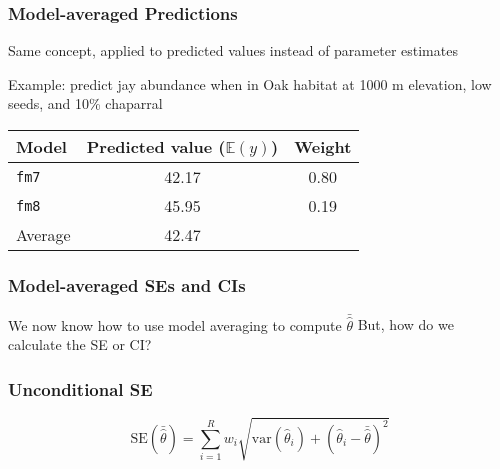\documentclass[color=usenames,dvipsnames]{beamer}\usepackage[]{graphicx}\usepackage[]{color}
\begin{document}
\begin{frame}
  \frametitle{Model-averaged Predictions}
  {Same concept, applied to predicted values instead of parameter
    estimates \par}
  \pause
  \vspace{0.3cm}
  {Example: predict jay abundance when in Oak habitat at 1000 m
    elevation, low seeds, and 10\% chaparral \par}
  \pause
  \begin{center}
    \begin{tabular}{lcc}
      \hline
      Model     & Predicted value ($\mathbb{E}(y)$) & Weight \\
      \hline
      {\tt fm7} & 42.17 & 0.80 \\
      {\tt fm8} & 45.95 & 0.19 \\
      \hline
      Average   & 42.47 & \\
      \hline
    \end{tabular}
  \end{center}
\end{frame}



\begin{frame}
  \frametitle{Model-averaged SEs and CIs}
  \large
  {We now know how to use model averaging to compute $\bar{\hat{\theta}}$}
  \pause
  \vfill
  {But, how do we calculate the SE or CI?}
\end{frame}



\begin{frame}
  \frametitle{Unconditional SE}
  \Large
  \[
    \mbox{SE}(\bar{\hat{\theta}}) = \sum_{i=1}^R w_i \sqrt{\mbox{var}(\hat{\theta}_i) +
      (\hat{\theta}_i - \bar{\hat{\theta}})^2}
  \]
\end{frame}
\end{document}
